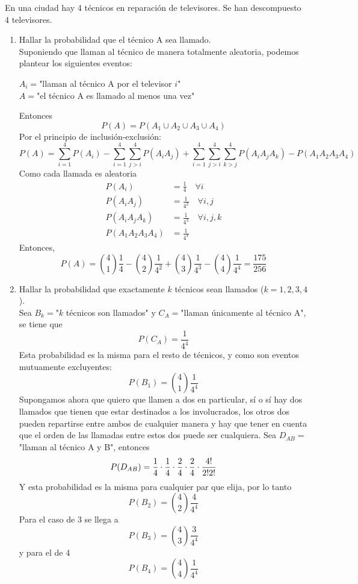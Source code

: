 \item En una ciudad hay 4 técnicos en reparación de televisores. Se han descompuesto 4 televisores.
    \begin{enumerate}
        \item Hallar la probabilidad que el técnico A sea llamado.\e\\
            Suponiendo que llaman al técnico de manera totalmente aleatoria, podemos plantear los siguientes eventos:\begin{center}
                $A_i=$"llaman al técnico A por el televisor $i$"\\
                $A=$"el técnico A es llamado al menos una vez"
            \end{center}
            Entonces\[P(A)=P(A_1\cup A_2\cup A_3\cup A_4)\]
            Por el principio de inclusión-exclusión:
            \[P(A)=\sum\limits_{i=1}^4P(A_i)-\sum\limits_{i=1}^4\sum\limits_{j>i}^4P(A_iA_j)+\sum\limits_{i=1}^4\sum\limits_{j>i}^4\sum\limits_{k>j}^4P(A_iA_jA_k)-P(A_1A_2A_3A_4)\]
            Como cada llamada es aleatoria \begin{align*}
                P(A_i)&=\frac{1}{4}\quad\forall i\\
                P(A_iA_j)&=\frac{1}{4^2}\quad\forall i,j\\
                P(A_iA_jA_k)&=\frac{1}{4^3}\quad\forall i,j,k\\
                P(A_1A_2A_3A_4)&=\frac{1}{4^4}
            \end{align*}
            Entonces,
            \[P(A)=\binom{4}{1}\frac{1}{4}-\binom{4}{2}\frac{1}{4^2}+\binom{4}{3}\frac{1}{4^3}-\binom{4}{4}\frac{1}{4^4}=\frac{175}{256}\]
        \item Hallar la probabilidad que exactamente $k$ técnicos sean llamados ($k=1,2,3,4$).\e\\
            Sea $B_k=$"$k$ técnicos son llamados" y $C_A=$"llaman únicamente al técnico A", se tiene que \[P(C_A)=\frac{1}{4^4}\]
            Esta probabilidad es la misma para el resto de técnicos, y como son eventos mutuamente excluyentes:\[P(B_1)=\binom{4}{1}\frac{1}{4^4}\]
            Supongamos ahora que quiero que llamen a dos en particular, sí o sí hay dos llamados que tienen que estar destinados a los involucrados, los otros dos pueden repartirse entre ambos de cualquier manera y hay que tener en cuenta que el orden de las llamadas entre estos dos puede ser cualquiera. Sea $D_{AB}=$"llaman al técnico A y B", entonces\[P(D_{AB})=\frac{1}{4}\cdot\frac{1}{4}\cdot\frac{2}{4}\cdot\frac{2}{4}\cdot\frac{4!}{2!2!}\]
            Y esta probabilidad es la misma para cualquier par que elija, por lo tanto\[P(B_2)=\binom{4}{2}\frac{4}{4^4}\]
            Para el caso de 3 se llega a\[P(B_3)=\binom{4}{3}\frac{3}{4^4}\]
            y para el de 4 \[P(B_4)=\binom{4}{4}\frac{1}{4^4}\]
    \end{enumerate}